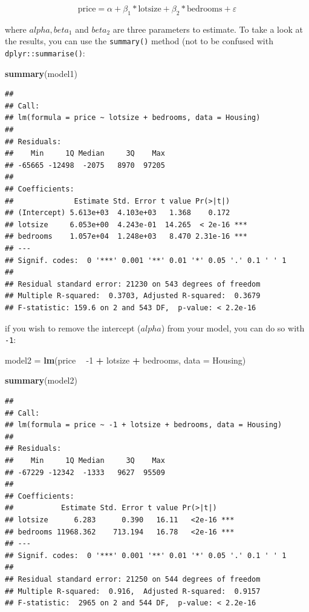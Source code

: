 \documentclass[]{gitbook}
\newenvironment{Shaded}{\begin{snugshade}}{\end{snugshade}}
\newcommand{\DataTypeTok}[1]{\textcolor[rgb]{0.13,0.29,0.53}{#1}}
\newcommand{\DecValTok}[1]{\textcolor[rgb]{0.00,0.00,0.81}{#1}}
\newcommand{\KeywordTok}[1]{\textcolor[rgb]{0.13,0.29,0.53}{\textbf{#1}}}
\newcommand{\NormalTok}[1]{#1}
\newcommand{\OperatorTok}[1]{\textcolor[rgb]{0.81,0.36,0.00}{\textbf{#1}}}
\newcommand{\StringTok}[1]{\textcolor[rgb]{0.31,0.60,0.02}{#1}}
\theoremstyle{definition}
\theoremstyle{definition}
\theoremstyle{definition}
\theoremstyle{remark}
\begin{document}
\[
\text{price} = \alpha + \beta_1 * \text{lotsize} + \beta_2 * \text{bedrooms} + \varepsilon
\]

where \(alpha, beta_1\) and \(beta_2\) are three parameters to estimate.
To take a look at the results, you can use the \texttt{summary()} method
(not to be confused with \texttt{dplyr::summarise()}:

\begin{Shaded}
\begin{Highlighting}[]
\KeywordTok{summary}\NormalTok{(model1)}
\end{Highlighting}
\end{Shaded}

\begin{verbatim}
## 
## Call:
## lm(formula = price ~ lotsize + bedrooms, data = Housing)
## 
## Residuals:
##    Min     1Q Median     3Q    Max 
## -65665 -12498  -2075   8970  97205 
## 
## Coefficients:
##              Estimate Std. Error t value Pr(>|t|)    
## (Intercept) 5.613e+03  4.103e+03   1.368    0.172    
## lotsize     6.053e+00  4.243e-01  14.265  < 2e-16 ***
## bedrooms    1.057e+04  1.248e+03   8.470 2.31e-16 ***
## ---
## Signif. codes:  0 '***' 0.001 '**' 0.01 '*' 0.05 '.' 0.1 ' ' 1
## 
## Residual standard error: 21230 on 543 degrees of freedom
## Multiple R-squared:  0.3703, Adjusted R-squared:  0.3679 
## F-statistic: 159.6 on 2 and 543 DF,  p-value: < 2.2e-16
\end{verbatim}

if you wish to remove the intercept (\(alpha\)) from your model, you can
do so with \texttt{-1}:

\begin{Shaded}
\begin{Highlighting}[]
\NormalTok{model2 =}\StringTok{ }\KeywordTok{lm}\NormalTok{(price }\OperatorTok{~}\StringTok{ }\DecValTok{-1} \OperatorTok{+}\StringTok{ }\NormalTok{lotsize }\OperatorTok{+}\StringTok{ }\NormalTok{bedrooms, }\DataTypeTok{data =}\NormalTok{ Housing)}

\KeywordTok{summary}\NormalTok{(model2)}
\end{Highlighting}
\end{Shaded}

\begin{verbatim}
## 
## Call:
## lm(formula = price ~ -1 + lotsize + bedrooms, data = Housing)
## 
## Residuals:
##    Min     1Q Median     3Q    Max 
## -67229 -12342  -1333   9627  95509 
## 
## Coefficients:
##           Estimate Std. Error t value Pr(>|t|)    
## lotsize      6.283      0.390   16.11   <2e-16 ***
## bedrooms 11968.362    713.194   16.78   <2e-16 ***
## ---
## Signif. codes:  0 '***' 0.001 '**' 0.01 '*' 0.05 '.' 0.1 ' ' 1
## 
## Residual standard error: 21250 on 544 degrees of freedom
## Multiple R-squared:  0.916,  Adjusted R-squared:  0.9157 
## F-statistic:  2965 on 2 and 544 DF,  p-value: < 2.2e-16
\end{verbatim}
\end{document}
